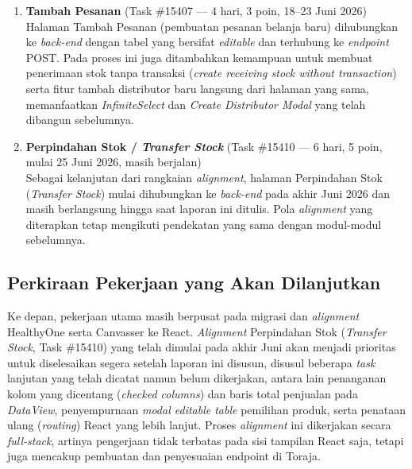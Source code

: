 \begin{enumerate}
          Proses ini diselesaikan pada 23 Juni 2026 dan branch pengerjaannya digabungkan
          (\textit{merge}) ke \textit{branch} \texttt{refactor-stock-management} pada
          akhir bulan.

    \item \textbf{Tambah Pesanan} (Task \#15407 --- 4 hari, 3 poin, 18--23 Juni 2026) \\
          Halaman Tambah Pesanan (pembuatan pesanan belanja baru) dihubungkan ke
          \textit{back-end} dengan tabel yang bersifat \textit{editable} dan terhubung ke
          \textit{endpoint} POST. Pada proses ini juga ditambahkan kemampuan untuk membuat
          penerimaan stok tanpa transaksi (\textit{create receiving stock without
              transaction}) serta fitur tambah distributor baru langsung dari halaman yang
          sama, memanfaatkan \textit{InfiniteSelect} dan \textit{Create Distributor Modal}
          yang telah dibangun sebelumnya.

    \item \textbf{Perpindahan Stok / \textit{Transfer Stock}} (Task \#15410 --- 6 hari, 5 poin, mulai 25 Juni 2026, masih berjalan) \\
          Sebagai kelanjutan dari rangkaian \textit{alignment}, halaman Perpindahan Stok
          (\textit{Transfer Stock}) mulai dihubungkan ke \textit{back-end} pada akhir Juni
          2026 dan masih berlangsung hingga saat laporan ini ditulis. Pola \textit{alignment}
          yang diterapkan tetap mengikuti pendekatan yang sama dengan modul-modul
          sebelumnya.

\end{enumerate}

\subsection{Perkiraan Pekerjaan yang Akan Dilanjutkan}

Ke depan, pekerjaan utama masih berpusat pada migrasi dan \textit{alignment}
HealthyOne serta Canvasser ke React. \textit{Alignment} Perpindahan Stok
(\textit{Transfer Stock}, Task \#15410) yang telah dimulai pada akhir Juni akan
menjadi prioritas untuk diselesaikan segera setelah laporan ini disusun,
disusul beberapa \textit{task} lanjutan yang telah dicatat namun belum
dikerjakan, antara lain penanganan kolom yang dicentang (\textit{checked
    columns}) dan baris total penjualan pada \textit{DataView}, penyempurnaan
\textit{modal editable table} pemilihan produk, serta penataan ulang
(\textit{routing}) React yang lebih lanjut. Proses \textit{alignment} ini
dikerjakan secara \textit{full-stack}, artinya pengerjaan tidak terbatas pada
sisi tampilan React saja, tetapi juga mencakup pembuatan dan penyesuaian
endpoint di Toraja.

